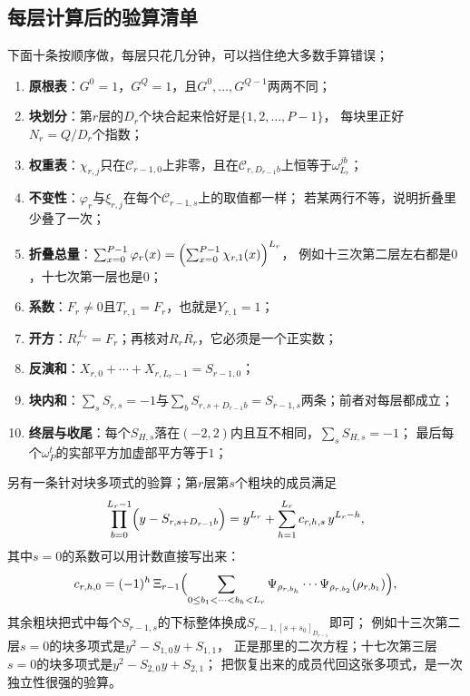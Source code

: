 \documentclass[UTF8,a4paper,11pt]{ctexart}
\begin{document}
\subsection{每层计算后的验算清单}
下面十条按顺序做，每层只花几分钟，可以挡住绝大多数手算错误；
\begin{enumerate}
 \item \textbf{原根表}：$G^0=1$，$G^{Q}=1$，且$G^0,\dots,G^{Q-1}$两两不同；
 \item \textbf{块划分}：第$r$层的$D_r$个块合起来恰好是$\{1,2,\dots,P-1\}$，
       每块里正好$N_r=Q/D_r$个指数；
 \item \textbf{权重表}：$\chi_{r,j}$只在$\mathscr{C}_{r-1,0}$上非零，且在$\mathscr{C}_{r,D_{r-1}b}$上恒等于$\omega_{L_r}^{jb}$；
 \item \textbf{不变性}：$\varphi_r$与$\xi_{r,j}$在每个$\mathscr{C}_{r-1,s}$上的取值都一样；
       若某两行不等，说明折叠里少叠了一次；
 \item \textbf{折叠总量}：$\sum_{x=0}^{P-1}\varphi_r(x)=\Bigl(\sum_{x=0}^{P-1}\chi_{r,1}(x)\Bigr)^{L_r}$，
       例如十三次第二层左右都是$0$，十七次第一层也是$0$；
 \item \textbf{系数}：$F_r\ne0$且$T_{r,1}=F_r$，也就是$Y_{r,1}=1$；
 \item \textbf{开方}：$R_r^{\,L_r}=F_r$；再核对$R_r\overline{R_r}$，它必须是一个正实数；
 \item \textbf{反演和}：$X_{r,0}+\cdots+X_{r,L_r-1}=S_{r-1,0}$；
 \item \textbf{块内和}：$\sum_sS_{r,s}=-1$与$\sum_bS_{r,s+D_{r-1}b}=S_{r-1,s}$两条；前者对每层都成立；
 \item \textbf{终层与收尾}：每个$S_{H,s}$落在$(-2,2)$内且互不相同，$\sum_sS_{H,s}=-1$；
       最后每个$\omega_P^t$的实部平方加虚部平方等于$1$；
\end{enumerate}

另有一条针对块多项式的验算；第$r$层第$s$个粗块的成员满足
\[
 \prod_{b=0}^{L_r-1}\Bigl(y-S_{r,s+D_{r-1}b}\Bigr)
 =y^{L_r}+\sum_{h=1}^{L_r}c_{r,h,s}\,y^{L_r-h},
\]
其中$s=0$的系数可以用计数直接写出来：
\[
 c_{r,h,0}=(-1)^{h}\,\Xi_{r-1}\Bigl(
 \sum_{0\le b_1<\cdots<b_{h}<L_r}
 \Psi_{\rho_{r,b_{h}}}\cdots\Psi_{\rho_{r,b_2}}(\rho_{r,b_1})\Bigr),
\]
其余粗块把式中每个$S_{r-1,s}$的下标整体换成$S_{r-1,[s+s_0]_{D_{r-1}}}$即可；
例如十三次第二层$s=0$的块多项式是$y^2-S_{1,0}y+S_{1,1}$，
正是那里的二次方程；十七次第三层$s=0$的块多项式是$y^2-S_{2,0}y+S_{2,1}$；
把恢复出来的成员代回这张多项式，是一次独立性很强的验算。
\end{document}
